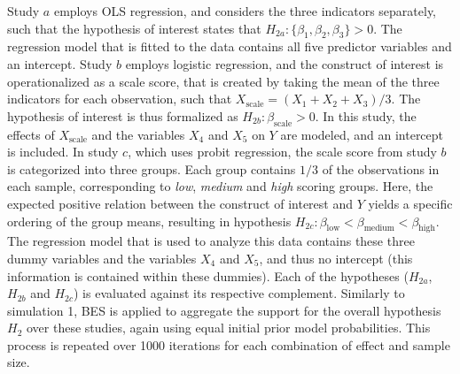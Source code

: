 \documentclass[11pt,reqno]{article}
\begin{document}
\begin{appendices}
Study $a$ employs OLS regression, and considers the three indicators separately, such that the hypothesis of interest states that $H_{2a}: \{\beta_1, \beta_2, \beta_3\} > 0$.
The regression model that is fitted to the data contains all five predictor variables and an intercept.
Study $b$ employs logistic regression, and the construct of interest is operationalized as a scale score, that is created by taking the mean of the three indicators for each observation, such that $X_{\text{scale}} = (X_1 + X_2 + X_3)/3$.
The hypothesis of interest is thus formalized as $H_{2b}: \beta_{\text{scale}} > 0$.
In this study, the effects of $X_{\text{scale}}$ and the variables $X_4$ and $X_5$ on $Y$ are modeled, and an intercept is included.
In study $c$, which uses probit regression, the scale score from study $b$ is categorized into three groups.
Each group contains $1/3$ of the observations in each sample, corresponding to \textit{low}, \textit{medium} and \textit{high} scoring groups.
Here, the expected positive relation between the construct of interest and $Y$ yields a specific ordering of the group means, resulting in hypothesis $H_{2c}: \beta_{\text{low}} < \beta_{\text{medium}} < \beta_{\text{high}}$.
The regression model that is used to analyze this data contains these three dummy variables and the variables $X_4$ and $X_5$, and thus no intercept (this information is contained within these dummies).
Each of the hypotheses ($H_{2a}$, $H_{2b}$ and $H_{2c}$) is evaluated against its respective complement.
Similarly to simulation 1, BES is applied to aggregate the support for the overall hypothesis $H_2$ over these studies, again using equal initial prior model probabilities.
This process is repeated over 1000 iterations for each combination of effect and sample size.


\end{appendices}
\end{document}
